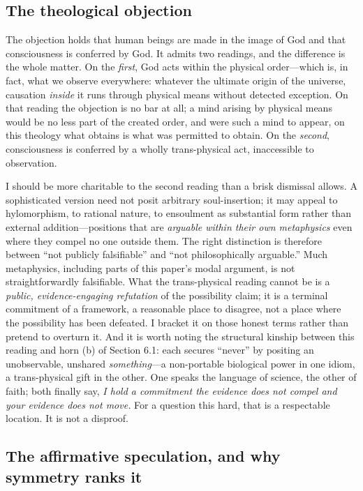 \documentclass[11pt]{article}
\begin{document}
\subsection{The theological objection}

The objection holds that human beings are made in the image of God and that consciousness is conferred by God. It admits two readings, and the difference is the whole matter. On the \emph{first}, God acts within the physical order---which is, in fact, what we observe everywhere: whatever the ultimate origin of the universe, causation \emph{inside} it runs through physical means without detected exception. On that reading the objection is no bar at all; a mind arising by physical means would be no less part of the created order, and were such a mind to appear, on this theology what obtains is what was permitted to obtain. On the \emph{second}, consciousness is conferred by a wholly trans-physical act, inaccessible to observation.

I should be more charitable to the second reading than a brisk dismissal allows. A sophisticated version need not posit arbitrary soul-insertion; it may appeal to hylomorphism, to rational nature, to ensoulment as substantial form rather than external addition---positions that are \emph{arguable within their own metaphysics} even where they compel no one outside them. The right distinction is therefore between ``not publicly falsifiable'' and ``not philosophically arguable.'' Much metaphysics, including parts of this paper's modal argument, is not straightforwardly falsifiable. What the trans-physical reading cannot be is a \emph{public, evidence-engaging refutation} of the possibility claim; it is a terminal commitment of a framework, a reasonable place to disagree, not a place where the possibility has been defeated. I bracket it on those honest terms rather than pretend to overturn it. And it is worth noting the structural kinship between this reading and horn (b) of Section 6.1: each secures ``never'' by positing an unobservable, unshared \emph{something}---a non-portable biological power in one idiom, a trans-physical gift in the other. One speaks the language of science, the other of faith; both finally say, \emph{I hold a commitment the evidence does not compel and your evidence does not move.} For a question this hard, that is a respectable location. It is not a disproof.

\subsection{The affirmative speculation, and why symmetry ranks it}
\end{document}
